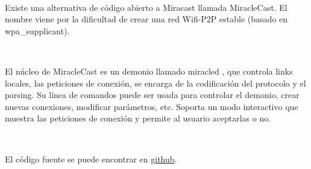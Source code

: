 \

Existe una alternativa de código abierto a Miracast llamada MiracleCast. El nombre viene por la dificultad de crear una red Wifi-P2P estable (basado en wpa_supplicant).

\

El núcleo de MiracleCast es un demonio llamado miracled \cite{MiracleCast}, que controla links locales, las peticiones de conexión, se encarga de la codificación del protocolo y el parsing.
Su línea de comandos puede ser usada para controlar el demonio, crear nuevas conexiones, modificar parámetros, etc.
Soporta un modo interactivo que muestra las peticiones de conexión y permite al usuario aceptarlas o no.

\

El código fuente se puede encontrar en \href{https://github.com/albfan/miraclecast}{github}.
